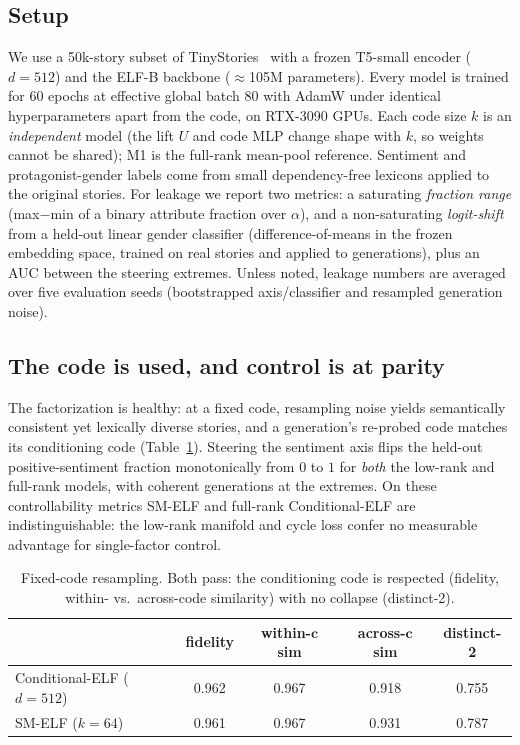 \documentclass[11pt]{article}
\newcommand{\cb}{\bm{c}}
\begin{document}
\subsection{Setup}
We use a 50k-story subset of TinyStories~\cite{tinystories} with a frozen T5-small
encoder ($d{=}512$) and the ELF-B backbone ($\approx$105M parameters). Every model is
trained for 60 epochs at effective global batch 80 with AdamW under identical
hyperparameters apart from the code, on RTX-3090 GPUs. Each code size $k$ is an
\emph{independent} model (the lift $U$ and code MLP change shape with $k$, so weights
cannot be shared); M1 is the full-rank mean-pool reference. Sentiment and
protagonist-gender labels come from small dependency-free lexicons applied to the
original stories. For leakage we report two metrics: a saturating \emph{fraction
range} (max$-$min of a binary attribute fraction over $\alpha$), and a non-saturating
\emph{logit-shift} from a held-out linear gender classifier (difference-of-means in
the frozen embedding space, trained on real stories and applied to generations),
plus an AUC between the steering extremes. Unless noted, leakage numbers are averaged
over five evaluation seeds (bootstrapped axis/classifier and resampled generation
noise).

\subsection{The code is used, and control is at parity}
The factorization is healthy: at a fixed code, resampling noise yields semantically
consistent yet lexically diverse stories, and a generation's re-probed code matches
its conditioning code (Table~\ref{tab:c1}). Steering the sentiment axis flips the
held-out positive-sentiment fraction monotonically from $0$ to $1$ for \emph{both} the
low-rank and full-rank models, with coherent generations at the extremes. On these
controllability metrics SM-ELF and full-rank Conditional-ELF are indistinguishable:
the low-rank manifold and cycle loss confer no measurable advantage for single-factor
control.

\begin{table}[h]\centering\small
\begin{tabular}{lcccc}
& fidelity & within-$\cb$ sim & across-$\cb$ sim & distinct-2 \\
\hline
Conditional-ELF ($d{=}512$) & 0.962 & 0.967 & 0.918 & 0.755 \\
SM-ELF ($k{=}64$)           & 0.961 & 0.967 & 0.931 & 0.787 \\
\end{tabular}
\caption{Fixed-code resampling. Both pass: the conditioning code is respected
(fidelity, within- vs.\ across-code similarity) with no collapse (distinct-2).}
\label{tab:c1}
\end{table}
\end{document}

